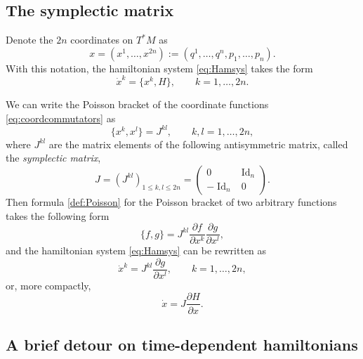 \documentclass[english,fontsize=11pt,paper=a5,oneside]{scrbook}
\DeclareMathOperator{\Id}{Id}
\theoremstyle{definition}
\begin{document}
\subsection{The symplectic matrix}\label{sec:symplmat}
    Denote the $2n$ coordinates on $T^*M$ as
    \begin{equation}
        x=(x^1, \ldots, x^{2n}) := (q^1, \ldots, q^n, p_1, \ldots, p_n).
    \end{equation}
    With this notation, the hamiltonian system \eqref{eq:Hamsys} takes the form
    \begin{equation}
        \dot x^k = \big\{x^k, H\big\}, \qquad k=1,\ldots,2n.
    \end{equation}
    
    We can write the Poisson bracket of the coordinate functions \eqref{eq:coordcommutators} as
    \begin{equation}
        \big\{x^k, x^l\big\} = J^{kl}, \qquad k,l = 1,\ldots,2n,
    \end{equation}
    where $J^{kl}$ are the matrix elements of the following antisymmetric matrix, called the \emph{symplectic matrix},
    \begin{equation}\label{eq:symmat}
        J = \left(J^{kl}\right)_{1\leq k,l\leq2n} = \begin{pmatrix}0 & \Id_n \\ -\Id_n & 0\end{pmatrix}.
    \end{equation}
    Then formula \eqref{def:Poisson} for the Poisson bracket of two arbitrary functions takes the following form
    \begin{equation}\label{eq:coordPB}
        \big\{f,g\big\} = J^{kl} \frac{\partial f}{\partial x^k}\frac{\partial g}{\partial x^l},
    \end{equation}
    and the hamiltonian system \eqref{eq:Hamsys} can be rewritten as
    \begin{equation}
        \dot x^k = J^{kl} \frac{\partial g}{\partial x^l}, \qquad k=1,\ldots,2n,
    \end{equation}
    or, more compactly,
    \begin{equation}\label{eq:hamsysJ}
        \dot x = J \frac{\partial H}{\partial x}.
    \end{equation}

\subsection{A brief detour on time-dependent hamiltonians}\label{sec:timedepH}
\end{document}
